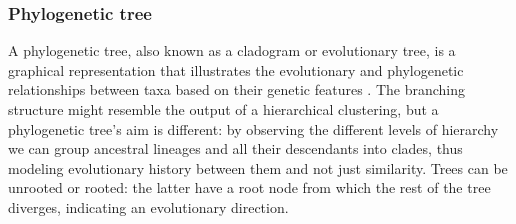 \documentclass[a4paper, 12pt]{report}
\begin{document}
\subsubsection{Phylogenetic tree}
A phylogenetic tree, also known as a cladogram or evolutionary tree, is a graphical representation that illustrates the evolutionary and phylogenetic relationships between taxa based on their genetic features \parencite{zouCommonMethodsPhylogenetic2024}. The branching structure might resemble the output of a hierarchical clustering, but a phylogenetic tree's aim is different: by observing the different levels of hierarchy we can group ancestral lineages and all their descendants into clades, thus modeling evolutionary history between them and not just similarity. Trees can be unrooted or rooted: the latter have a root node from which the rest of the tree diverges, indicating an evolutionary direction.
\end{document}

